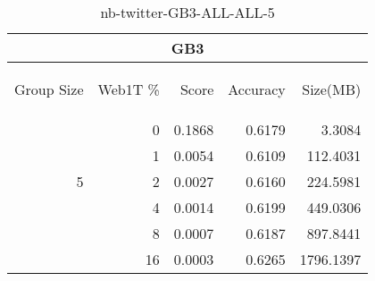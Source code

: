 \begin{center}
\begin{table}[htbp]
\begin{tabular}{ | r | r | r | r | r |}
\hline
\multicolumn{5}{|c|}{GB3}\\
\hline
\begin{sideways}Group Size\end{sideways} & \begin{sideways}Web1T \%\end{sideways} & \begin{sideways}Score\end{sideways} & \begin{sideways}Accuracy\end{sideways} & \begin{sideways}Size(MB)\end{sideways}\\
\hline
\multirow{5}{*}{5}
 & 0 & 0.1868 & 0.6179 & 3.3084\\ \cline{2-5}
 & 1 & 0.0054 & 0.6109 & 112.4031\\ \cline{2-5}
 & 2 & 0.0027 & 0.6160 & 224.5981\\ \cline{2-5}
 & 4 & 0.0014 & 0.6199 & 449.0306\\ \cline{2-5}
 & 8 & 0.0007 & 0.6187 & 897.8441\\ \cline{2-5}
 & 16 & 0.0003 & 0.6265 & 1796.1397\\ \cline{2-5}
\hline
\end{tabular}
\caption{nb-twitter-GB3-ALL-ALL-5}
\label{table:nb-twitter-GB3-ALL-ALL-5}
\end{table}
\end{center}

